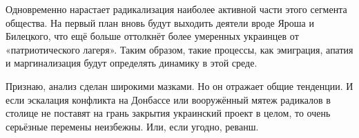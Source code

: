 Одновременно нарастает радикализация наиболее активной части этого сегмента
общества. На первый план вновь будут выходить деятели вроде Яроша и Билецкого,
что ещё больше оттолкнёт более умеренных украинцев от «патриотического лагеря».
Таким образом, такие процессы, как эмиграция, апатия и маргинализация будут
определять динамику в этой среде. 

Признаю, анализ сделан широкими мазками. Но он отражает общие тенденции. И если
эскалация конфликта на Донбассе или вооружённый мятеж радикалов в столице не
поставят на грань закрытия украинский проект в целом, то очень серьёзные
перемены неизбежны. Или, если угодно, реванш.

